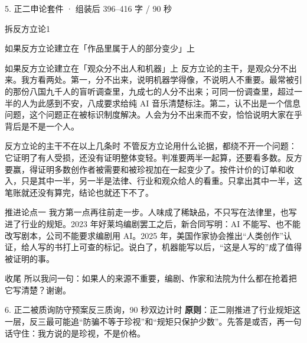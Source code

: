 \documentclass[script,pro]{debate}
\begin{document}
\begin{kit}{5. 正二申论}{套件 · 组装后 396–416 字 / 90 秒}
\begin{pick}{拆反方立论}{1}
\begin{module}{如果反方立论建立在「作品里属于人的部分变少」上}
\end{module}
\begin{module}{如果反方立论建立在「观众分不出人和机器」上}
反方立论的主干，是观众分不出来。我方看两处。第一，分不出来，说明机器学得像，不说明人不重要。最常被引的那份八国九千人的盲听调查里，九成七的人分不出来；可同一份调查里，超过一半的人为此感到不安，八成要求给纯 AI 音乐清楚标注。第二，认不出是一个信息问题，这个问题正在被标识制度解决。人会为分不出来而不安，恰恰说明大家在乎背后是不是一个人。
\end{module}
\begin{fallback}{反方立论的主干不在以上几条时}
不管反方立论用什么论据，都绕不开一个问题：它证明了有人受损，还没有证明整体变轻。判准要两半一起算，还要看多数。反方要赢，得证明多数创作者被需要和被珍视加在一起变少了。按件计价的订单和收入，只是其中一半，另一半是法律、行业和观众给人的看重。只拿出其中一半，这笔账就还没有算完，结论也就还下不了。
\end{fallback}
\end{pick}
\begin{fixed}{推进论点一}
我方第一点再往前走一步。人味成了稀缺品，不只写在法律里，也写进了行业的规矩。2023 年好莱坞编剧罢工之后，新合同写明：AI 不能写、也不能改写剧本，公司不能要求编剧用 AI。2025 年，美国作家协会推出“人类创作”认证，给人写的书打上可查的标记。说白了，机器能写以后，“这是人写的”成了值得被证明的事。
\end{fixed}
\begin{fixed}{收尾}
所以我问一句：如果人的来源不重要，编剧、作家和法院为什么都在抢着把它写清楚？谢谢。
\end{fixed}
\end{kit}

\begin{stage}{6. 正二被质询防守预案}{反三质询，90 秒双边计时}
\textbf{原则}：正二刚推进了行业规矩这一层，反三最可能追“防骗不等于珍视”和“规矩只保护少数”。先答是或否，再一句话守住：我方说的是珍视，不是价格。
\begin{qa}
\end{qa}
\end{stage}
\end{document}
